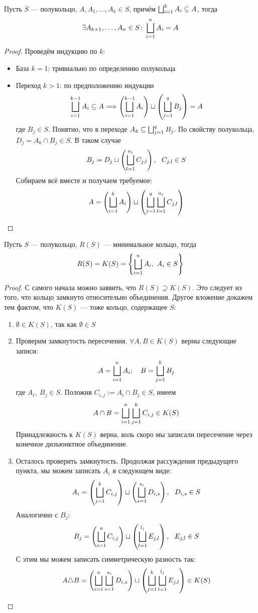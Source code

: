 \begin{lemma}
	Пусть $S$ --- полукольцо, $A, A_1, \ldots, A_k \in S$, причём $\bigsqcup_{i = 1}^k A_i \subseteq A$, тогда
	\[
		\exists A_{k + 1}, \ldots, A_n \in S \colon \bigsqcup_{i = 1}^n A_i = A
	\]
\end{lemma}

\begin{proof}
	Проведём индукцию по $k$:
	\begin{itemize}
		\item База $k = 1$: тривиально по определению полукольца
		
		\item Переход $k > 1$: по предположению индукции
		\[
			\bigsqcup_{i = 1}^{k - 1} A_i \subseteq A \Longrightarrow \left(\bigsqcup_{i = 1}^{k - 1} A_i\right) \sqcup \left(\bigsqcup_{j = 1}^q B_j\right) = A
		\]
		где $B_j \in S$. Понятно, что в переходе $A_k \subseteq \bigsqcup_{j = 1}^q B_j$. По свойству полукольца, $D_j = A_k \cap B_j \in S$. В таком случае
		\[
			B_j = D_j \sqcup \left(\bigsqcup_{l = 1}^{a_j} C_{j, l}\right),\ \ C_{j, l} \in S
		\]
		Собираем всё вместе и получаем требуемое:
		\[
			A = \left(\bigsqcup_{i = 1}^k A_i\right) \sqcup \left(\bigsqcup_{j = 1}^q \bigsqcup_{l = 1}^{a_j} C_{j, l}\right)
		\]
	\end{itemize}
\end{proof}

\begin{theorem}
	Пусть $S$ --- полукольцо, $R(S)$ --- минимальное кольцо, тогда
	\[
		R(S) = K(S) = \left\{\bigsqcup_{i = 1}^n A_i,\ A_i \in S\right\}
	\]
\end{theorem}

\begin{proof}
	С самого начала можно заявить, что $R(S) \supseteq K(S)$. Это следует из того, что кольцо замкнуто относительно объединения. Другое вложение докажем тем фактом, что $K(S)$ --- тоже кольцо, содержащее $S$:
	\begin{enumerate}
		\item $\emptyset \in K(S)$, так как $\emptyset \in S$
		
		\item Проверим замкнутость пересечения. $\forall A, B \in K(S)$ верны следующие записи:
		\[
			A = \bigsqcup_{i = 1}^n A_i; \quad B = \bigsqcup_{j = 1}^k B_j
		\]
		где $A_i,\ B_j \in S$. Положив $C_{i, j} := A_i \cap B_j \in S$, имеем
		\[
			A \cap B = \bigsqcup_{i = 1}^n \bigsqcup_{j = 1}^k C_{i, j} \in K(S)
		\]
		Принадлежность к $K(S)$ верна, коль скоро мы записали пересечение через конечное дизъюнктное объединение.
		
		\item Осталось проверить замкнутость. Продолжая рассуждения предыдущего пункта, мы можем записать $A_i$ в следующем виде:
		\[
			A_i = \left(\bigsqcup_{j = 1}^k C_{i, j}\right) \sqcup \left(\bigsqcup_{s = 1}^{s_i} D_{i, s}\right),\ \ D_{i, s} \in S
		\]
		Аналогично с $B_j$:
		\[
			B_j = \left(\bigsqcup_{i = 1}^n C_{i, j}\right) \sqcup \left(\bigsqcup_{l = 1}^{l_j} E_{j, l}\right),\ \ E_{j, l} \in S
		\]
		С этим мы можем записать симметрическую разность так:
		\[
			A \triangle B = \left(\bigsqcup_{i = 1}^n \bigsqcup_{s = 1}^{s_i} D_{i, s}\right) \sqcup \left(\bigsqcup_{j = 1}^k \bigsqcup_{l = 1}^{l_j} E_{j, l}\right) \in K(S)
		\]
	\end{enumerate}
\end{proof}

